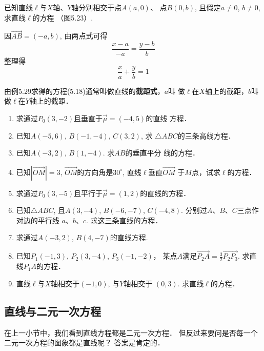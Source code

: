 \begin{example}
    已知直线$\ell$与$X$轴、$Y$轴分别相交于点$A(a,0)$、
点$B(0,b)$, 且假定$a\ne 0$, $b\ne 0$, 求直线$\ell$的方程
（图5.23）.
\end{example}

\begin{solution}
    因$\Vec{AB}=(-a,b)$, 由两点式可得
\[\frac{x-a}{-a}=\frac{y-b}{b}\]
整理得
\begin{equation}
    \frac{x}{a}+\frac{y}{b}=1
\end{equation}
\end{solution}

由例5.29求得的方程(5.18)通常叫做直线的\textbf{截距式}，$a$叫
做$\ell$在$X$轴上的截距，$b$叫做$\ell$在$Y$轴上的截距．

\begin{ex}
\begin{enumerate}
    \item 求通过$P_0(3,-2)$且垂直于$\vec{\mu}=(-4,5)$的直线
    方程．
    \item 已知$A(-5,6)$, $B(-1,-4)$, $C(3,2)$, 求
    $\triangle ABC$的三条高线方程．
    \item 已知$A(-3,2)$, $B(1,-4)$. 求$\overline{AB}$的垂直平分
    线的方程．
    \item 已知$|\Vec{OM}|=3$, $\Vec{OM}$的方向角是$30^{\circ}$, 直线$\ell$垂直$\Vec{OM}$
    于$M$点，试求$\ell$的方程．
    \item 求通过$P_0(3,-5)$且平行于$\vec{\mu}=(1,2)$的直线的方程．
    \item 已知$\triangle ABC$, 且$A(3,-4)$, $B(-6,-7)$, 
    $C(-4,8)$. 分别过$A$、$B$、$C$三点作对边的平行线
    $a$、$b$、$c$. 求这三条直线的方程．
    \item 求通过$A(-3,2)$, $B(4,-7)$的直线方程.
    \item 已知$P_1(-1,3)$, $P_2(3,-4)$, $P_3(-1,-2)$，
    某点$A$满足$\Vec{P_2A}=\frac{3}{2}\Vec{P_2P_3}$. 求直线$P_1A$的方程． 
    \item 直线$\ell$与$X$轴相交于$(-1,0)$, 与$Y$轴相交于
    $(0,3)$. 求直线$\ell$的方程．
\end{enumerate}
\end{ex}

\subsection{直线与二元一次方程}
在上一小节中，我们看到直线方程都是二元一次方程．
但反过来要问是否每一个二元一次方程的图象都是直线呢？
答案是肯定的．

